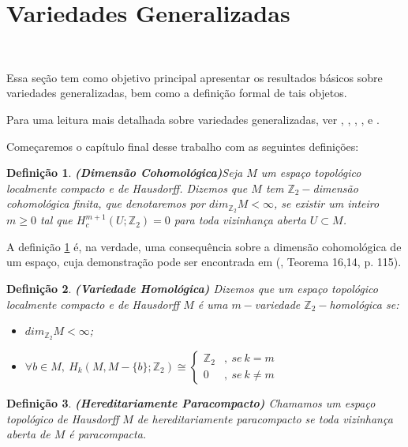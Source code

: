 \documentclass[12pt,oneside]{book} %
\newtheorem{defi}   {\hspace{0.5cm}Defini\c c\~ao}[chapter]
\newcommand{\Z}{\mathbb{Z}}
\begin{document}
\section{Variedades Generalizadas}\label{sec_varied_gen}

\

\par Essa seção tem como objetivo principal apresentar os resultados básicos sobre variedades generalizadas, bem como a definição formal de tais objetos.

\par Para uma leitura mais detalhada sobre variedades generalizadas, ver \cite{biasi}, \cite{bredon_2}, \cite{mio_1}, \cite{mio_2}, \cite{denise}  e \cite{wilder}.

\par Começaremos o capítulo final desse trabalho com as seguintes definições:

\begin{defi}{\bf (Dimensão Cohomológica)}\label{defi_dim_coh}
	Seja $M$ um espaço topológico localmente compacto e de Hausdorff. Dizemos que $M$ tem $\Z_{2}-$dimensão cohomológica finita, que denotaremos por $dim_{\Z_{2}}M<\infty$\index{dim$_{\Z_{2}}<\infty$}, se existir um inteiro $m\geq 0$ tal que $H^{m+1}_{c}(U;\Z_{2})=0$ para toda vizinhança aberta $U\subset M$.
\end{defi}

\par A definição \ref{defi_dim_coh} é, na verdade, uma consequência sobre a dimensão cohomológica de um espaço, cuja demonstração pode ser encontrada em (\cite{bredon_2}, Teorema 16,14, p. 115).

\begin{defi}{\bf (Variedade Homológica)}
	Dizemos que um espaço topológico localmente compacto e de Hausdorff $M$ é uma $m-$variedade $\Z_{2}-$homológica se:
	\begin{itemize}
		\item $dim_{\Z_{2}}M<\infty$;
		\item $\forall b\in M, \ H_{k}(M,M-\{b\};\Z_{2})\cong \left\{ \begin{array}{cl}
			\Z_{2} & , \ se \ k=m \\
			0 & , \ se \ k\neq m
		\end{array}\right.$
	\end{itemize}
\end{defi}

\begin{defi}{\bf (Hereditariamente Paracompacto)}
Chamamos um espaço topológico de Hausdorff $M$ de hereditariamente paracompacto se toda vizinhança aberta de $M$ é paracompacta.
\end{defi} 
\end{document}

